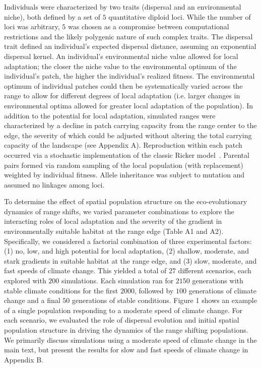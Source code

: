 \documentclass[12pt, oneside]{article}
\begin{document}
Individuals were characterized by two traits (dispersal and an environmental niche), both defined by a set of $5$ quantitative diploid loci. While the number of loci was arbitrary, $5$ was chosen as a compromise between computational restrictions and the likely polygenic nature of such complex traits. The dispersal trait defined an individual's expected dispersal distance, assuming an exponential dispersal kernel. An individual's environmental niche value allowed for local adaptation; the closer the niche value to the environmental optimum of the individual's patch, the higher the individual's realized fitness. The environmental optimum of individual patches could then be systematically varied across the range to allow for different degrees of local adaptation (i.e. larger changes in environmental optima allowed for greater local adaptation of the population). In addition to the potential for local adaptation, simulated ranges were characterized by a decline in patch carrying capacity from the range center to the edge, the severity of which could be adjusted without altering the total carrying capacity of the landscape (see Appendix A). Reproduction within each patch occurred via a stochastic implementation of the classic Ricker model~\citep{ricker1954stock, melbourne2008extinction}. Parental pairs formed via random sampling of the local population (with replacement) weighted by individual fitness. Allele inheritance was subject to mutation and assumed no linkages among loci.

To determine the effect of spatial population structure on the eco-evolutionary dynamics of range shifts, we varied parameter combinations to explore the interacting roles of local adaptation and the severity of the gradient in environmentally suitable habitat at the range edge (Table A1 and A2). Specifically, we considered a factorial combination of three experimental factors: (1) no, low, and high potential for local adaptation, (2) shallow, moderate, and stark gradients in suitable habitat at the range edge, and (3) slow, moderate, and fast speeds of climate change. This yielded a total of $27$ different scenarios, each explored with $200$ simulations. Each simulation ran for $2150$ generations with stable climate conditions for the first $2000$, followed by $100$ generations of climate change and a final $50$ generations of stable conditions. Figure 1 shows an example of a single population responding to a moderate speed of climate change. For each scenario, we evaluated the role of dispersal evolution and initial spatial population structure in driving the dynamics of the range shifting populations. We primarily discuss simulations using a moderate speed of climate change in the main text, but present the results for slow and fast speeds of climate change in Appendix B.
\end{document}
